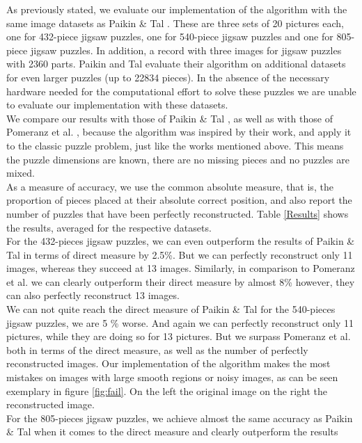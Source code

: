 \documentclass[11pt]{report}
\begin{document}
As previously stated, we evaluate our implementation of the algorithm with
the same image datasets as Paikin \& Tal \cite{Paikin2015}. These are three sets
of 20 pictures each, one for 432-piece jigsaw puzzles, one for 540-piece jigsaw puzzles and
one for 805-piece jigsaw puzzles. In addition, a record with three images for jigsaw
puzzles with 2360 parts. Paikin and Tal evaluate their algorithm on additional
datasets for even larger puzzles (up to 22834 pieces). In the absence of the
necessary hardware needed for the computational effort to solve these puzzles we
are unable to evaluate our implementation with these datasets. \\
We compare our
results with those of Paikin \& Tal \cite{Paikin2015}, as well as with those of
Pomeranz et al. \cite{Pomeranz2011}, because the algorithm was inspired by their
work, and apply it to the classic puzzle problem, just like the works mentioned
above. This means the puzzle dimensions are known, there are no missing pieces
and no puzzles are mixed. \\
As a measure of accuracy, we use the common absolute measure, that is, the
proportion of pieces placed at their absolute correct position, and also report
the number of puzzles that have been perfectly reconstructed. Table
\ref{Results} shows the results, averaged for the respective datasets. \\
For the 432-pieces jigsaw puzzles, we can even outperform the results of Paikin \& Tal in
terms of direct measure by 2.5\%. But we can perfectly reconstruct only 11 images,
whereas they succeed at 13 images. Similarly, in comparison to Pomeranz et
al. we can clearly outperform their direct measure by almost 8\% however, they
can also perfectly reconstruct 13 images. \\
We can not quite reach the direct measure of Paikin \& Tal for the 540-pieces
jigsaw puzzles, we are 5 \% worse. And again we can perfectly reconstruct only 11
pictures, while they are doing so for 13 pictures. But we surpass Pomeranz et
al. both in terms of the direct measure, as well as the number of perfectly
reconstructed images. Our implementation of the algorithm makes the most
mistakes on images with large smooth regions or noisy images, as can be seen
exemplary in figure \ref{fig:fail}. On the left the original image on the right
the reconstructed image. \\
For the 805-pieces jigsaw puzzles, we achieve almost the same accuracy as Paikin
\& Tal when it comes to the direct measure and clearly outperform the results
\end{document}
